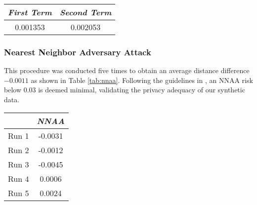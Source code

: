 \begin{center}
\renewcommand{\arraystretch}{1.2} %
  \begin{tabular}{cc}
  \toprule 
  \textit{First Term}  & 
  \textit{Second Term} \\
  \midrule
    0.001353 & 0.002053 \\
    \hline
  \end{tabular}
  \label{tab:reid}
\end{center}

\subsubsection{Nearest Neighbor Adversary Attack} \label{nnaa_supp}
This procedure was conducted five times to obtain an average distance difference $-0.0011$ as shown in Table \ref{tab:nnaa}. Following the guidelines in \cite{Yan_Brad_2022}, an NNAA risk below 0.03 is deemed minimal, validating the privacy adequacy of our synthetic data.

\begin{center}
\renewcommand{\arraystretch}{1.2} %
  \begin{tabular}{cc}
  \toprule 
  \textit{}  & 
  \textit{NNAA} \\
  \midrule
   Run 1 & -0.0031 \\
   Run 2 & -0.0012 \\
   Run 3 & -0.0045 \\
   Run 4 & 0.0006 \\
   Run 5 & 0.0024 \\
   \hline
  \end{tabular}
  \label{tab:nnaa}
\end{center}

